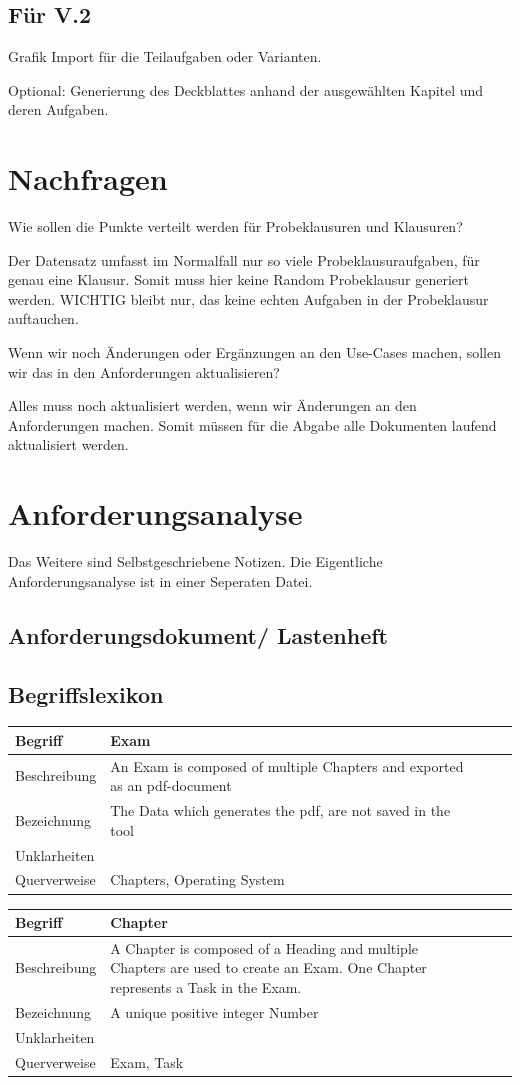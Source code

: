 \documentclass[a4paper]{article}
\newcommand{\begriff}[5]{
    \begin{table}[!htbp]
    \centering
        \begin{tabularx}{\textwidth}{|lX|lX|}
        \hline
        Begriff & #1\\\hline
        Beschreibung & #2\\
        Bezeichnung & #3\\
        Unklarheiten & #4\\
        Querverweise & #5\\
        \hline
        \end{tabularx}
    \end{table}
}
\begin{document}
\subsection{Für V.2}

Grafik Import für die Teilaufgaben oder Varianten.

Optional: Generierung des Deckblattes anhand der ausgewählten Kapitel und deren Aufgaben.

\pagebreak
\section{Nachfragen}


Wie sollen die Punkte verteilt werden für Probeklausuren und Klausuren?

Der Datensatz umfasst im Normalfall nur so viele Probeklausuraufgaben, für genau eine Klausur. Somit muss hier keine Random Probeklausur generiert werden. WICHTIG bleibt nur, das keine echten Aufgaben in der Probeklausur auftauchen.

Wenn wir noch Änderungen oder Ergänzungen an den Use-Cases machen, sollen wir das in den Anforderungen aktualisieren?

Alles muss noch aktualisiert werden, wenn wir Änderungen an den Anforderungen machen. Somit müssen für die Abgabe alle Dokumenten laufend aktualisiert werden.

\pagebreak
\section{Anforderungsanalyse}

Das Weitere sind Selbstgeschriebene Notizen. Die Eigentliche Anforderungsanalyse ist in einer Seperaten Datei.

\subsection{Anforderungsdokument/ Lastenheft}

\subsection{Begriffslexikon}

\begriff{Exam}{An Exam is composed of multiple Chapters and exported as an pdf-document}{The Data which generates the pdf, are not saved in the tool}{}{Chapters, Operating System}

\begriff{Chapter}{A Chapter is composed of a Heading and multiple Chapters are used to create an Exam. One Chapter represents a Task in the Exam.}{A unique positive integer Number}{}{Exam, Task}
\end{document}
